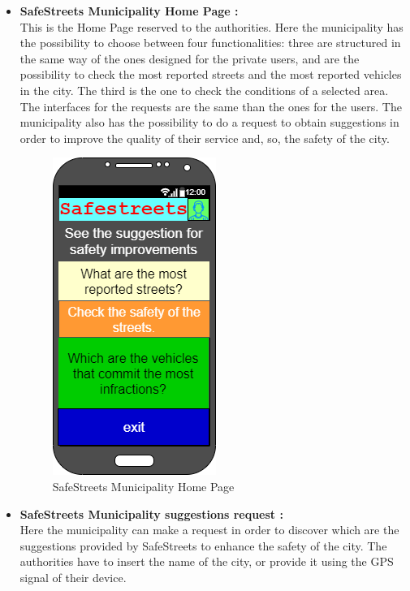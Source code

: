 \documentclass[titlepage]{article}
\begin{document}
\begin{itemize}
\begin{itemize}
	\newpage
	
	
	
	
	
	\item \textbf{SafeStreets Municipality Home Page :}\\
	
	This is the Home Page reserved to the authorities. Here the municipality has the possibility to choose between four functionalities:
	three are structured in the same way of the ones designed for the private users, and are the possibility to check the most reported streets and  the most reported vehicles in the city. The third is the one to check the conditions of a selected area. The interfaces for the requests are the same than the ones for the users. The municipality also has the possibility to do a request to obtain suggestions in order to improve the quality of their service and, so, the safety of the city. 
	
	\begin{figure}[h]
	\includegraphics[scale=0.8]{Mockups/Municipality main functionalities.png}
	\centering
	\caption{SafeStreets Municipality Home Page}
	\end{figure}
	\FloatBarrier
	
	\newpage
	
	
	
	
	
	\item \textbf{SafeStreets Municipality suggestions request :}\\
	
	Here the municipality can make a request in order to discover which are the suggestions provided by SafeStreets to enhance the safety of the city. The authorities have to insert the name of the city, or provide it using the GPS signal of their device.
	

\end{itemize}
\end{itemize}
\end{document}
